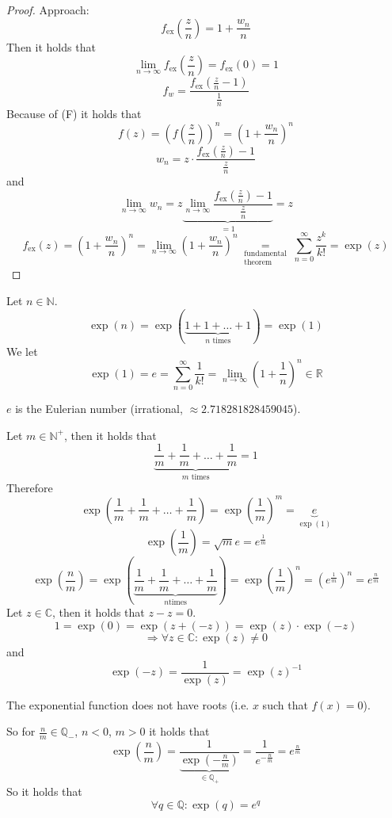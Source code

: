 \documentclass[a4paper,landscape,twocolumn]{article}
\theoremstyle{definition}
\begin{document}
\begin{proof}
  Approach:
  \[ f_{\text{ex}}\left(\frac zn\right) = 1 + \frac{w_n}{n} \]
  Then it holds that
  \[ \lim_{n\to\infty} f_{\text{ex}}\left(\frac zn\right) = f_{\text{ex}}(0) = 1 \]
  \[ f_w = \frac{f_{\text{ex}}\left(\frac zn - 1\right)}{\frac 1n} \]
  Because of (F) it holds that
  \[ f(z) = \left(f\left(\frac zn\right)\right)^n = \left(1 + \frac{w_n}{n}\right)^n \]
  \[ w_n = z \cdot \frac{f_{\text{ex}}\left(\frac zn\right) - 1}{\frac zn} \]
  and
  \[ \lim_{n\to\infty} w_n = z \underbrace{\lim_{n\to\infty} \frac{f_{\text{ex}}\left(\frac zn\right) - 1}{\frac zn}}_{=1} = z \]
  \[
    f_{\text{ex}}(z)
    = \left(1 + \frac{w_n}{n}\right)^n
    = \lim_{n\to\infty} \left(1 + \frac{w_n}{n}\right)^n
    \underset{\substack{\text{fundamental} \\ \text{theorem}}}{=}
    \sum_{n=0}^\infty \frac{z^k}{k!} = \exp(z)
  \]
\end{proof}

Let $n \in \mathbb N$.
\[ \operatorname{exp}(n) = \exp(\underbrace{1 + 1 + \ldots + 1}_{n \text{ times}})
  = \exp(1)
\]
We let
\[
  \exp(1)
  = e
  = \sum_{n=0}^\infty \frac1{k!}
  = \lim_{n\to\infty} \left(1 + \frac1n\right)^n \in \mathbb R
\]

$e$ is the Eulerian number (irrational, $\approx 2.718281828459045$).


Let $m \in \mathbb N^+$, then it holds that
\[ \underbrace{\frac1m + \frac1m + \ldots + \frac1m}_{m \text{ times}} = 1 \]
Therefore
\[
  \exp\left(\frac1m + \frac1m + \ldots + \frac1m\right)
  = \exp\left(\frac1m\right)^m = \underbrace{e}_{\exp(1)}
\]
\[
  \exp\left(\frac1m\right)
  = \sqrt{m}{e} = e^{\frac1m}
\] \[
  \exp\left(\frac nm\right)
  = \exp\left(\underbrace{\frac1m + \frac1m + \ldots + \frac1m}_{n \text{times}}\right)
  = \exp(\frac1m)^n
  = \left(e^{\frac1m}\right)^n
  = e^{\frac nm}
\]
Let $z \in \mathbb C$, then it holds that $z - z = 0$.
\[ 1 = \exp(0) = \exp(z + (-z)) = \exp(z) \cdot \exp(-z) \]
\[ \Rightarrow \forall z \in \mathbb C: \exp(z) \neq 0 \]
and
\[ \exp(-z) = \frac1{\exp(z)} = \exp(z)^{-1} \]

The exponential function does not have roots (i.e. $x$ such that $f(x) = 0$).


So for $\frac nm \in \mathbb Q_-$, $n < 0$, $m > 0$ it holds that
\[ \exp(\frac nm) = \frac{1}{\underbrace{\exp(-\frac nm)}_{\in \mathbb Q_+}} = \frac{1}{e^{-\frac nm}}
= e^{\frac nm}
\]
So it holds that
\[ \forall q \in \mathbb Q: \exp(q) = e^q \]
\end{document}
